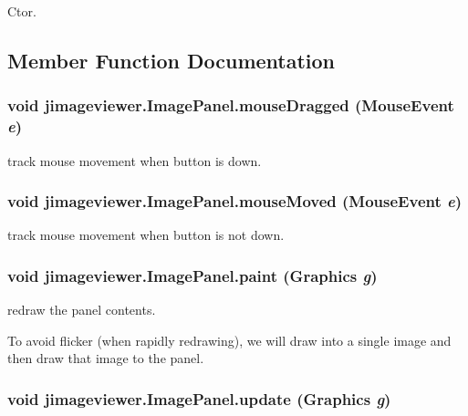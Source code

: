Ctor. 



\subsection{Member Function Documentation}
\subsubsection{\setlength{\rightskip}{0pt plus 5cm}void jimageviewer.Image\-Panel.mouse\-Dragged (Mouse\-Event {\em e})}\label{classjimageviewer_1_1_image_panel_301a331c15ca88319c8ba90d5ad4dae5}


track mouse movement when button is down. 

\subsubsection{\setlength{\rightskip}{0pt plus 5cm}void jimageviewer.Image\-Panel.mouse\-Moved (Mouse\-Event {\em e})}\label{classjimageviewer_1_1_image_panel_fa2b1f4d0a4fe58912b100665f701ff3}


track mouse movement when button is not down. 

\subsubsection{\setlength{\rightskip}{0pt plus 5cm}void jimageviewer.Image\-Panel.paint (Graphics {\em g})}\label{classjimageviewer_1_1_image_panel_6f9e1ae43d968bcd7c33e375968dab55}


redraw the panel contents. 

To avoid flicker (when rapidly redrawing), we will draw into a single image and then draw that image to the panel. 
\subsubsection{\setlength{\rightskip}{0pt plus 5cm}void jimageviewer.Image\-Panel.update (Graphics {\em g})}\label{classjimageviewer_1_1_image_panel_fd1c867a7c118990e586a06eede3bbd6}


